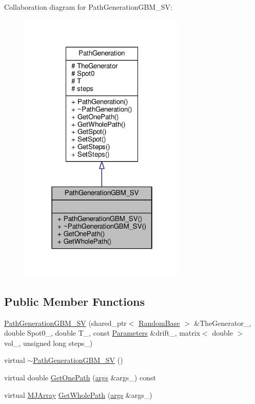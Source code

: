 Collaboration diagram for Path\+Generation\+G\+B\+M\+\_\+\+SV\+:
\nopagebreak
\begin{figure}[H]
\begin{center}
\leavevmode
\includegraphics[width=226pt]{classPathGenerationGBM__SV__coll__graph}
\end{center}
\end{figure}
\subsection*{Public Member Functions}
\begin{DoxyCompactItemize}
\item 
\hyperlink{classPathGenerationGBM__SV_a614c81f73f8313817b2e94cd1746393b}{Path\+Generation\+G\+B\+M\+\_\+\+SV} (shared\+\_\+ptr$<$ \hyperlink{classRandomBase}{Random\+Base} $>$ \&The\+Generator\+\_\+, double Spot0\+\_\+, double T\+\_\+, const \hyperlink{classParameters}{Parameters} \&drift\+\_\+, matrix$<$ double $>$ vol\+\_\+, unsigned long steps\+\_\+)
\item 
virtual \hyperlink{classPathGenerationGBM__SV_a66138a60ae971e3947c37b05b985c281}{$\sim$\+Path\+Generation\+G\+B\+M\+\_\+\+SV} ()
\item 
virtual double \hyperlink{classPathGenerationGBM__SV_a9db1428d6599489d22b2fa843c56fc31}{Get\+One\+Path} (\hyperlink{path__generation_8h_a75c13cde2074f502cc4348c70528572d}{args} \&args\+\_\+) const
\item 
virtual \hyperlink{classMJArray}{M\+J\+Array} \hyperlink{classPathGenerationGBM__SV_abb36f42991ec304d6efeaf772b8367c1}{Get\+Whole\+Path} (\hyperlink{path__generation_8h_a75c13cde2074f502cc4348c70528572d}{args} \&args\+\_\+)
\end{DoxyCompactItemize}
